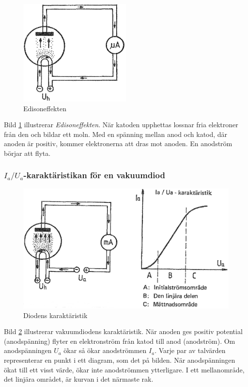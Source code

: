 \begin{figure}
\includegraphics[width=0.5\textwidth]{images/cropped_pdfs/bild_2_2-25.pdf}
\caption{Edisoneffekten}
\label{fig:BildII2-25}
\end{figure}

Bild \ref{fig:BildII2-25} illustrerar \emph{Edisoneffekten}. När katoden upphettas lossnar fria elektroner från den och bildar ett moln.
Med en spänning mellan anod och katod, där anoden är positiv, kommer elektronerna att dras mot anoden.
En anodström börjar att flyta.

\subsubsection{\(I_a/U_a\)-karaktäristikan för en vakuumdiod}

\begin{figure}
\includegraphics[width=\textwidth]{images/cropped_pdfs/bild_2_2-26.pdf}
\caption{Diodens karaktäristik}
\label{fig:BildII2-26}
\end{figure}

Bild \ref{fig:BildII2-26} illustrerar vakuumdiodens karaktäristik.
När anoden ges positiv potential (anodspänning) flyter en elektronström från katod till anod (anodström).
Om anodspänningen \(U_a\) ökar så ökar anodströmmen \(I_a\).
Varje par av talvärden representerar en punkt i ett diagram, som det på bilden.
När anodspänningen ökat till ett visst värde, ökar inte anodströmmen ytterligare.
I ett mellanområde, det linjära området, är kurvan i det närmaste rak.

